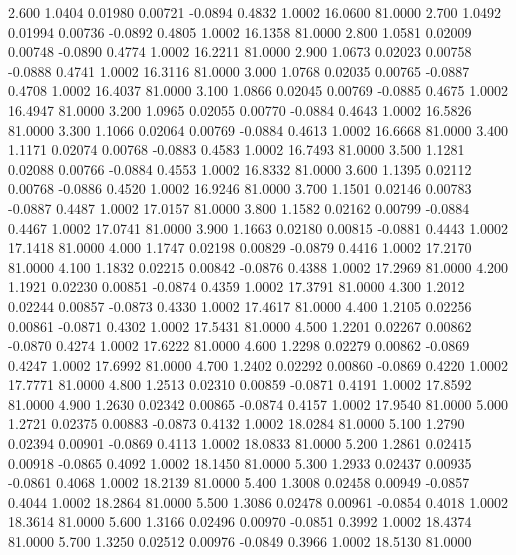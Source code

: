    2.600   1.0404   0.01980   0.00721  -0.0894   0.4832   1.0002  16.0600  81.0000
   2.700   1.0492   0.01994   0.00736  -0.0892   0.4805   1.0002  16.1358  81.0000
   2.800   1.0581   0.02009   0.00748  -0.0890   0.4774   1.0002  16.2211  81.0000
   2.900   1.0673   0.02023   0.00758  -0.0888   0.4741   1.0002  16.3116  81.0000
   3.000   1.0768   0.02035   0.00765  -0.0887   0.4708   1.0002  16.4037  81.0000
   3.100   1.0866   0.02045   0.00769  -0.0885   0.4675   1.0002  16.4947  81.0000
   3.200   1.0965   0.02055   0.00770  -0.0884   0.4643   1.0002  16.5826  81.0000
   3.300   1.1066   0.02064   0.00769  -0.0884   0.4613   1.0002  16.6668  81.0000
   3.400   1.1171   0.02074   0.00768  -0.0883   0.4583   1.0002  16.7493  81.0000
   3.500   1.1281   0.02088   0.00766  -0.0884   0.4553   1.0002  16.8332  81.0000
   3.600   1.1395   0.02112   0.00768  -0.0886   0.4520   1.0002  16.9246  81.0000
   3.700   1.1501   0.02146   0.00783  -0.0887   0.4487   1.0002  17.0157  81.0000
   3.800   1.1582   0.02162   0.00799  -0.0884   0.4467   1.0002  17.0741  81.0000
   3.900   1.1663   0.02180   0.00815  -0.0881   0.4443   1.0002  17.1418  81.0000
   4.000   1.1747   0.02198   0.00829  -0.0879   0.4416   1.0002  17.2170  81.0000
   4.100   1.1832   0.02215   0.00842  -0.0876   0.4388   1.0002  17.2969  81.0000
   4.200   1.1921   0.02230   0.00851  -0.0874   0.4359   1.0002  17.3791  81.0000
   4.300   1.2012   0.02244   0.00857  -0.0873   0.4330   1.0002  17.4617  81.0000
   4.400   1.2105   0.02256   0.00861  -0.0871   0.4302   1.0002  17.5431  81.0000
   4.500   1.2201   0.02267   0.00862  -0.0870   0.4274   1.0002  17.6222  81.0000
   4.600   1.2298   0.02279   0.00862  -0.0869   0.4247   1.0002  17.6992  81.0000
   4.700   1.2402   0.02292   0.00860  -0.0869   0.4220   1.0002  17.7771  81.0000
   4.800   1.2513   0.02310   0.00859  -0.0871   0.4191   1.0002  17.8592  81.0000
   4.900   1.2630   0.02342   0.00865  -0.0874   0.4157   1.0002  17.9540  81.0000
   5.000   1.2721   0.02375   0.00883  -0.0873   0.4132   1.0002  18.0284  81.0000
   5.100   1.2790   0.02394   0.00901  -0.0869   0.4113   1.0002  18.0833  81.0000
   5.200   1.2861   0.02415   0.00918  -0.0865   0.4092   1.0002  18.1450  81.0000
   5.300   1.2933   0.02437   0.00935  -0.0861   0.4068   1.0002  18.2139  81.0000
   5.400   1.3008   0.02458   0.00949  -0.0857   0.4044   1.0002  18.2864  81.0000
   5.500   1.3086   0.02478   0.00961  -0.0854   0.4018   1.0002  18.3614  81.0000
   5.600   1.3166   0.02496   0.00970  -0.0851   0.3992   1.0002  18.4374  81.0000
   5.700   1.3250   0.02512   0.00976  -0.0849   0.3966   1.0002  18.5130  81.0000

